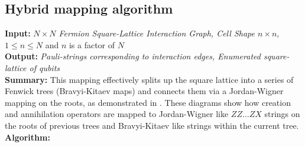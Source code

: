 \subsection{Hybrid mapping algorithm}
\label{section:Hybridmapping}
\noindent
\textbf{Input:} \textit{$N\times N$ Fermion Square-Lattice Interaction Graph, Cell Shape $n \times n$}, $1\le n\le N$ and $n$ is a factor of $N$\\
\textbf{Output:} \textit{Pauli-strings corresponding to interaction edges, Enumerated square-lattice of qubits}\\
\textbf{Summary:} This mapping effectively splits up the square lattice into a series of Fenwick trees (Bravyi-Kitaev maps) and connects them via a Jordan-Wigner mapping on the roots, as demonstrated in . These diagrams show how creation and annihilation operators are mapped to Jordan-Wigner like $ZZ\ldots ZX$ strings on the roots of previous trees and Bravyi-Kitaev like strings within the current tree.\\
\textbf{Algorithm:}
